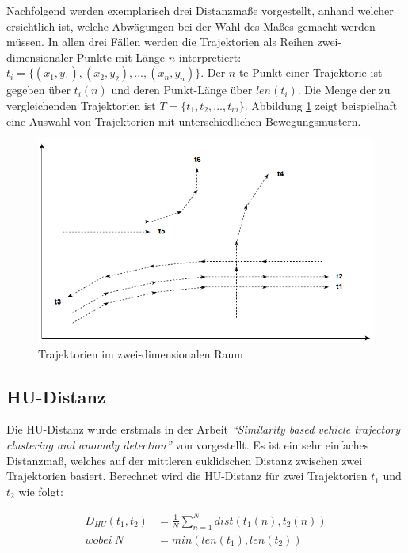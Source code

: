 Nachfolgend werden exemplarisch drei Distanzmaße vorgestellt, anhand welcher ersichtlich ist, welche Abwägungen
bei der Wahl des Maßes gemacht werden müssen.
In allen drei Fällen werden die Trajektorien als Reihen zwei-dimensionaler Punkte mit Länge $n$ interpretiert:
$t_i = \{(x_1, y_1), (x_2, y_2), ..., (x_n, y_n)\}$.
Der $n$-te Punkt einer Trajektorie ist gegeben über $t_i(n)$ und deren Punkt-Länge über $len(t_i)$.
Die Menge der zu vergleichenden Trajektorien ist $T = \{t_1, t_2, ..., t_m\}$.
Abbildung \ref{fig:grund_trajectories} zeigt beispielhaft eine Auswahl von Trajektorien mit
unterschiedlichen Bewegungsmustern.

\begin{figure}[H]
    \centering
    \includegraphics[width=0.6\linewidth]{resources/img/grundlagen/trajectories}
    \caption{Trajektorien im zwei-dimensionalen Raum}
    \label{fig:grund_trajectories}
\end{figure}

\subsection{HU-Distanz}
\label{sec:hu_distance}

Die HU-Distanz wurde erstmals in der Arbeit \textit{``Similarity based vehicle trajectory clustering and anomaly detection''}
von \cite[]{Hu2005} vorgestellt. Es ist ein sehr einfaches Distanzmaß, welches auf der mittleren euklidschen Distanz
zwischen zwei Trajektorien basiert. Berechnet wird die HU-Distanz für zwei Trajektorien $t_1$ und $t_2$ wie folgt:

\begin{ceqn}
\begin{align}
\label{eq_hu_distance1}
    D_{HU}(t_1, t_2) &= \frac{1}{N} \sum_{n = 1}^N dist(t_1(n), t_2(n)) \\
\label{eq_hu_distance2}
    wobei\ N &= min(len(t_1), len(t_2))
\end{align}
\end{ceqn}

